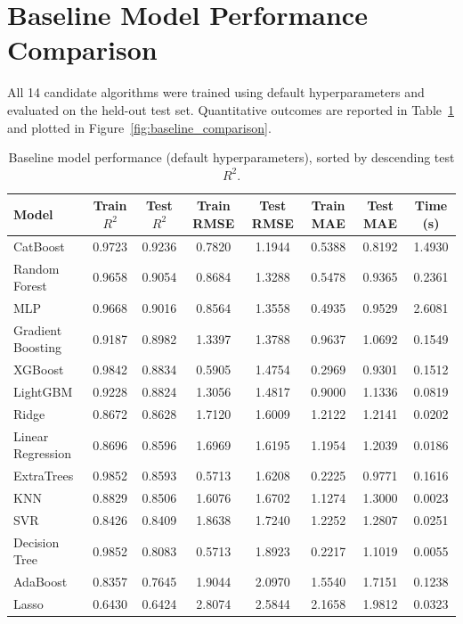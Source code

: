 \section{Baseline Model Performance Comparison}

All 14 candidate algorithms were trained using default hyperparameters and evaluated on the held-out test set. Quantitative outcomes are reported in Table~\ref{tab:baseline_performance}\cite{atique2026explainable} and plotted in Figure~\ref{fig:baseline_comparison}\cite{atique2026explainable}.

\begin{table}[H]
\centering

\scriptsize
\setlength{\tabcolsep}{3pt}
\renewcommand{\arraystretch}{1.05}

\begin{tabular}{|l|c|c|c|c|c|c|c|}
\hline
\textbf{Model} & \textbf{Train $R^2$} & \textbf{Test $R^2$} & \textbf{Train RMSE} & \textbf{Test RMSE} & \textbf{Train MAE} & \textbf{Test MAE} & \textbf{Time (s)} \\
\hline
CatBoost           & 0.9723 & 0.9236 & 0.7820 & 1.1944 & 0.5388 & 0.8192 & 1.4930 \\
Random Forest      & 0.9658 & 0.9054 & 0.8684 & 1.3288 & 0.5478 & 0.9365 & 0.2361 \\
MLP                & 0.9668 & 0.9016 & 0.8564 & 1.3558 & 0.4935 & 0.9529 & 2.6081 \\
Gradient Boosting  & 0.9187 & 0.8982 & 1.3397 & 1.3788 & 0.9637 & 1.0692 & 0.1549 \\
XGBoost            & 0.9842 & 0.8834 & 0.5905 & 1.4754 & 0.2969 & 0.9301 & 0.1512 \\
LightGBM           & 0.9228 & 0.8824 & 1.3056 & 1.4817 & 0.9000 & 1.1336 & 0.0819 \\
Ridge              & 0.8672 & 0.8628 & 1.7120 & 1.6009 & 1.2122 & 1.2141 & 0.0202 \\
Linear Regression  & 0.8696 & 0.8596 & 1.6969 & 1.6195 & 1.1954 & 1.2039 & 0.0186 \\
ExtraTrees         & 0.9852 & 0.8593 & 0.5713 & 1.6208 & 0.2225 & 0.9771 & 0.1616 \\
KNN                & 0.8829 & 0.8506 & 1.6076 & 1.6702 & 1.1274 & 1.3000 & 0.0023 \\
SVR                & 0.8426 & 0.8409 & 1.8638 & 1.7240 & 1.2252 & 1.2807 & 0.0251 \\
Decision Tree      & 0.9852 & 0.8083 & 0.5713 & 1.8923 & 0.2217 & 1.1019 & 0.0055 \\
AdaBoost           & 0.8357 & 0.7645 & 1.9044 & 2.0970 & 1.5540 & 1.7151 & 0.1238 \\
Lasso              & 0.6430 & 0.6424 & 2.8074 & 2.5844 & 2.1658 & 1.9812 & 0.0323 \\
\hline
\end{tabular}
\caption{Baseline model performance (default hyperparameters), sorted by descending test $R^2$.}
\label{tab:baseline_performance}
\end{table}

